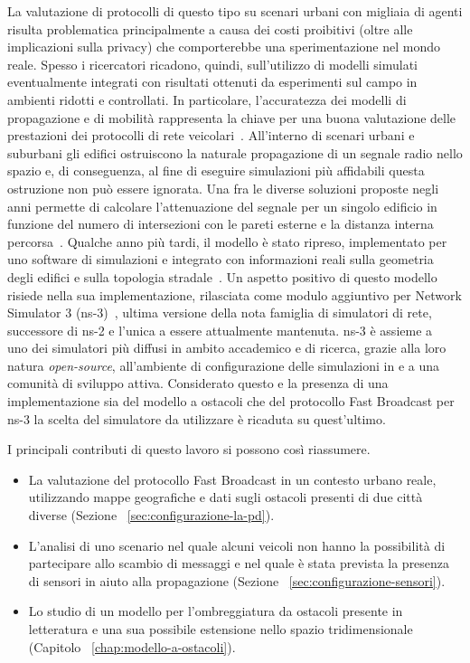 La valutazione di protocolli di questo tipo su scenari urbani con migliaia di agenti risulta
problematica principalmente a causa dei costi proibitivi (oltre alle implicazioni sulla privacy)
che comporterebbe una sperimentazione nel mondo reale.
Spesso i ricercatori ricadono, quindi, sull'utilizzo di modelli simulati eventualmente integrati con risultati ottenuti
da esperimenti sul campo in ambienti ridotti e controllati.
In particolare, l'accuratezza dei modelli di propagazione e di mobilità rappresenta la chiave per una buona valutazione delle prestazioni
dei protocolli di rete veicolari~\cite{4020783}.
All'interno di scenari urbani e suburbani gli edifici ostruiscono la naturale propagazione di un segnale radio nello spazio
e, di conseguenza, al fine di eseguire simulazioni più affidabili questa ostruzione non può essere ignorata.
Una fra le diverse soluzioni proposte negli anni permette di calcolare l'attenuazione del segnale per un singolo edificio
in funzione del numero di intersezioni con le pareti esterne e la distanza interna percorsa~\cite{5720204}.
Qualche anno più tardi, il modello è stato ripreso, implementato per uno software di simulazioni
e integrato con informazioni reali sulla geometria degli edifici e sulla topologia stradale~\cite{Carpenter:2015:OMI:2756509.2756512}.
Un aspetto positivo di questo modello risiede nella sua implementazione, rilasciata
come modulo aggiuntivo per Network Simulator 3 (ns-3)~\cite{ns3Website},
ultima versione della nota famiglia di simulatori di rete, successore di ns-2
e l'unica a essere attualmente mantenuta.
ns-3 è assieme a \omnet~\cite{omnetWebsite} uno dei simulatori più diffusi
in ambito accademico e di ricerca, grazie alla loro natura \textit{open-source},
all'ambiente di configurazione delle simulazioni in \Cpp{} e a una comunità di sviluppo attiva.
Considerato questo e la presenza di una implementazione sia del modello a ostacoli
che del protocollo Fast Broadcast per ns-3 la scelta del simulatore da utilizzare
è ricaduta su quest'ultimo.

I principali contributi di questo lavoro si possono così riassumere.
\begin{itemize}[noitemsep]
	\item La valutazione del protocollo Fast Broadcast in un contesto urbano reale,
				utilizzando mappe geografiche e dati sugli ostacoli presenti di due città diverse (Sezione ~\ref{sec:configurazione-la-pd}).
	\item L'analisi di uno scenario nel quale alcuni veicoli non hanno la possibilità di partecipare allo scambio di messaggi
				e nel quale è stata prevista la presenza di sensori in aiuto alla propagazione (Sezione ~\ref{sec:configurazione-sensori}).
	\item Lo studio di un modello per l'ombreggiatura da ostacoli presente in letteratura e una sua possibile estensione nello spazio tridimensionale (Capitolo ~\ref{chap:modello-a-ostacoli}).
\end{itemize}
%
